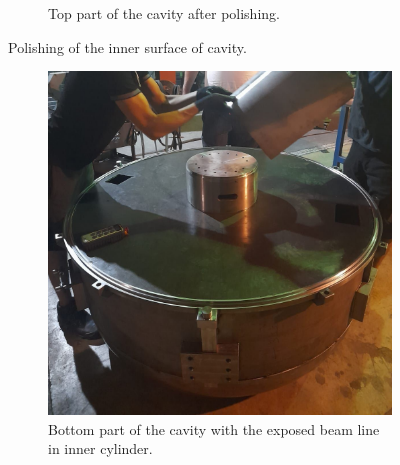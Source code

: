 \documentclass[a4paper,oneside,12pt]{report}
\numberwithin{equation}{chapter}
\begin{document}
\begin{figure}
\begin{subfigure}{.5\textwidth}
      \caption{Top part of the cavity after polishing.}
    \end{subfigure}
    \caption{Polishing of the inner surface of cavity.}
    \label{fig:manif_polishing}
\end{figure}


\begin{figure}
    \captionsetup[subfigure]{justification=centering}
    \captionsetup{justification=centering}
    \centering
    \begin{subfigure}{.5\textwidth}
      \centering
      \includegraphics[width=.96\linewidth]{./figures/manif/toroidal_sheets/rhodo_bottom_cropped.jpeg}
      \caption{Bottom part of the cavity with the exposed beam line in inner cylinder.}
    \end{subfigure}%
    \centering
    \begin{subfigure}{.5\textwidth}
      \centering

\end{subfigure}
\end{figure}
\end{document}
